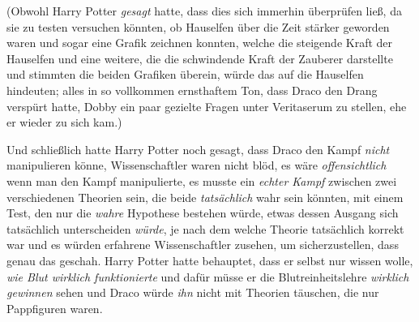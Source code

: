 (Obwohl Harry Potter \emph{gesagt} hatte, dass dies sich immerhin überprüfen ließ, da sie zu testen versuchen könnten, ob Hauselfen über die Zeit stärker geworden waren und sogar eine Grafik zeichnen konnten, welche die steigende Kraft der Hauselfen und eine weitere, die die schwindende Kraft der Zauberer darstellte und stimmten die beiden Grafiken überein, würde das auf die Hauselfen hindeuten; alles in so vollkommen ernsthaftem Ton, dass Draco den Drang verspürt hatte, Dobby ein paar gezielte Fragen unter Veritaserum zu stellen, ehe er wieder zu sich kam.)

Und schließlich hatte Harry Potter noch gesagt, dass Draco den Kampf \emph{nicht} manipulieren könne, Wissenschaftler waren nicht blöd, es wäre \emph{offensichtlich} wenn man den Kampf manipulierte, es musste ein \emph{echter Kampf} zwischen zwei verschiedenen Theorien sein, die beide \emph{tatsächlich} wahr sein könnten, mit einem Test, den nur die \emph{wahre} Hypothese bestehen würde, etwas dessen Ausgang sich tatsächlich unterscheiden \emph{würde}, je nach dem welche Theorie tatsächlich korrekt war und es würden erfahrene Wissenschaftler zusehen, um sicherzustellen, dass genau das geschah. Harry Potter hatte behauptet, dass er selbst nur wissen wolle, \emph{wie Blut wirklich funktionierte} und dafür müsse er die Blutreinheitslehre \emph{wirklich} \emph{gewinnen} sehen und Draco würde \emph{ihn} nicht mit Theorien täuschen, die nur Pappfiguren waren.

